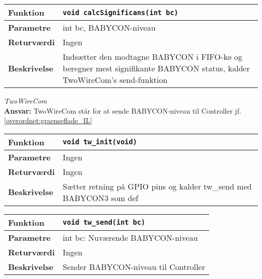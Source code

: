 \begin{center}
    \begin{tabular}{ | l | p{} |}
    \hline
    \textbf{Funktion}	& \verb+void calcSignificans(int bc) +						\\ \hline
    \textbf{Parametre} 	& int bc, BABYCON-niveau		\\ \hline
    \textbf{Returværdi}	& Ingen	 								\\ \hline
    \textbf{Beskrivelse}& Indsætter den modtagne BABYCON i FIFO-kø og beregner mest signifikante BABYCON status, kalder TwoWireCom's send-funktion		\\ \hline
    \end{tabular}
\end{center}


\textit{TwoWireCom} \\
\textbf{Ansvar:} TwoWireCom står for at sende BABYCON-niveau til Controller jf. \ref{overordnet:graenseflade_IL}

\begin{center}
    \begin{tabular}{ | l | p{} |}
    \hline
    \textbf{Funktion}	& \verb+void tw_init(void) +						\\ \hline
    \textbf{Parametre} 	& Ingen			\\ \hline
    \textbf{Returværdi}	& Ingen	 								\\ \hline
    \textbf{Beskrivelse}& Sætter retning på GPIO pins og kalder tw\_send med BABYCON3 som def		\\ \hline
    \end{tabular}
\end{center}

\begin{center}
    \begin{tabular}{ | l | p{} |}
    \hline
    \textbf{Funktion}	& \verb+void tw_send(int bc) +						\\ \hline
    \textbf{Parametre} 	& int bc: Nuværende BABYCON-niveau			\\ \hline
    \textbf{Returværdi}	& Ingen	 								\\ \hline
    \textbf{Beskrivelse}& Sender BABYCON-niveau til Controller		\\ \hline
    \end{tabular}
\end{center}


